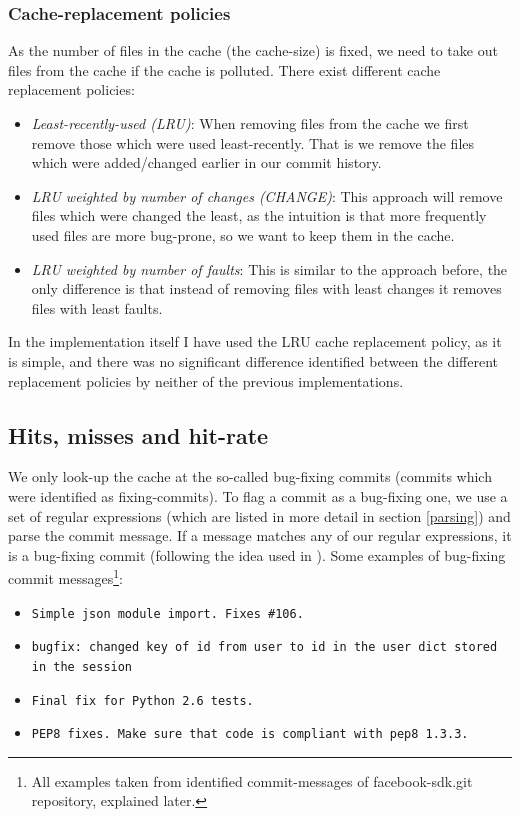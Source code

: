 \documentclass[12pt,twoside,notitlepage]{report}
\begin{document}
\subsubsection*{Cache-replacement policies}
As the number of files in the cache (the cache-size) is fixed, we need to take out files from the cache if the cache is polluted. There exist different cache replacement policies\cite{FixCache}:
\begin{itemize}
\item \textit{Least-recently-used (LRU)}: When removing files from the cache we first remove those which were used least-recently. That is we remove the files which were added/changed earlier in our commit history.
\item \textit{LRU weighted by number of changes (CHANGE)}: This approach will remove files which were changed the least, as the intuition is that more frequently used files are more bug-prone, so we want to keep them in the cache.
\item \textit{LRU weighted by number of faults}: This is similar to the approach before, the only difference is that instead of removing files with least changes it removes files with least faults.
\end{itemize}
In the implementation itself I have used the LRU cache replacement policy, as it is simple, and there was no significant difference identified between the different replacement policies by neither of the previous implementations\cite{FixCache}\cite{Sadowski}\cite{Bugcache}.
\subsection{Hits, misses and hit-rate}
We only look-up the cache at the so-called bug-fixing commits (commits which were identified as fixing-commits). To flag a commit as a bug-fixing one, we use a set of regular expressions (which are listed in more detail in section \ref{parsing}) and parse the commit message. If a message matches any of our regular expressions, it is a bug-fixing commit (following the idea used in \cite{KimZim}).
Some examples of bug-fixing commit messages\footnote{All examples taken from identified commit-messages of facebook-sdk.git repository, explained later.}:
\begin{itemize}
\item \texttt{Simple json module import. Fixes \#106.}

\item \texttt{bugfix: changed key of id from user to id in the user dict stored in the session}
\item \texttt{Final fix for Python 2.6 tests.}
\item \texttt{PEP8 fixes. Make sure that code is compliant with pep8 1.3.3.}
\end{itemize}
\end{document}
